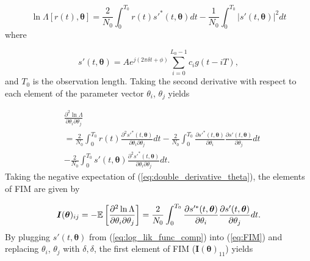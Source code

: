 \begin{appendices}
\begin{equation}
\label{eq:log_likelihood_func}
\ln\Lambda[r(t),\bm{\theta}]{=}\frac{2}{N_{0}}\int_{0}^{T_{0}}r(t)s'^{*}(t,\bm{\theta})dt{-}\frac{1}{N_{0}}\int_{0}^{T_{0}}|s'(t,\bm{\theta})|^{2}dt
\end{equation}
where 

\begin{equation}
\label{eq:log_lik_func_comp}
s'(t,\bm{\theta})=Ae^{j(2\pi\delta t+\phi)}\sum_{i=0}^{L_{0}-1}c_{i}g(t-iT),
\end{equation}
and $T_{0}$ is the observation length. Taking the second derivative with respect to each element of the parameter vector $\theta_{i}$, $\theta_{j}$ yields

\begin{equation}
\begin{aligned}
\label{eq:double_derivative_theta}
&\frac{\partial^2\ln\Lambda}{\partial\theta_{i}\partial\theta_{j}} \\
&{=}\frac{2}{N_{0}}\int_{0}^{T_{0}}r(t)\frac{\partial^2 s'^{*}(t,\bm{\theta})}{\partial \theta_{i}\partial \theta_{j}}dt
-\frac{2}{N_{0}}\int_{0}^{T_{0}}\frac{\partial s'^{*}(t,\bm{\theta})}{\partial \theta_{i}}\frac{\partial s'(t,\bm{\theta})}{\partial \theta_{j}}dt \\
&-\frac{2}{N_{0}}\int_{0}^{T_{0}}s'(t,\bm{\theta})\frac{\partial^2 s'^{*}(t,\bm{\theta})}{\partial \theta_{i}\partial \theta_{j}}dt.
\end{aligned}
\end{equation}
Taking the negative expectation of (\ref{eq:double_derivative_theta}), the elements of FIM are given by

\begin{equation}
\label{eq:FIM}
\bm{I}(\bm{\theta})_{ij}=-\mathbb{E}\left[\frac{\partial^2 \ln\Lambda}{\partial \theta_{i}\partial \theta_{j}}\right]=\frac{2}{N_{0}}\int_{0}^{T_{0}}\frac{\partial s'^{*}(t,\bm{\theta})}{\partial \theta_{i}}\frac{\partial s'(t,\bm{\theta})}{\partial \theta_{j}}dt.
\end{equation}
By plugging $s'(t,\bm{\theta})$ from (\ref{eq:log_lik_func_comp}) into (\ref{eq:FIM}) 
and replacing $\theta_{i}$, $\theta_{j}$ with $\delta,\delta$, 
the first element of FIM ($\bm{I}(\bm{\theta})_{11}$) yields


\end{appendices}
